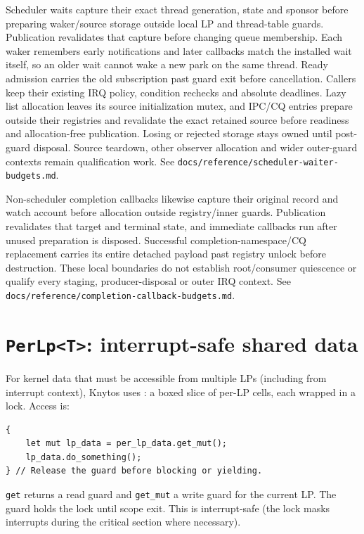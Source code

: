 Scheduler waits capture their exact thread generation, state and sponsor before
preparing waker/source storage outside local LP and thread-table guards.
Publication revalidates that capture before changing queue membership. Each
waker remembers early notifications and later callbacks match the installed
wait itself, so an older wait cannot wake a new park on the same thread. Ready
admission carries the old subscription past guard exit before cancellation.
Callers keep their existing IRQ policy, condition rechecks and absolute
deadlines. Lazy list allocation leaves its source initialization mutex, and IPC/CQ
entries prepare outside their registries and revalidate the exact retained
source before readiness and allocation-free publication. Losing or rejected
storage stays owned until post-guard disposal. Source teardown, other observer
allocation and wider outer-guard contexts remain qualification work.
See \texttt{docs/reference/scheduler-waiter-budgets.md}.

Non-scheduler completion callbacks likewise capture their original record and
watch account before allocation outside registry/inner guards. Publication
revalidates that target and terminal state, and immediate callbacks run after
unused preparation is disposed. Successful completion-namespace/CQ replacement
carries its entire detached payload past registry unlock before destruction.
These local boundaries do not establish root/consumer quiescence or qualify
every staging, producer-disposal or outer IRQ context. See
\texttt{docs/reference/completion-callback-budgets.md}.

\section{\texttt{PerLp<T>}: interrupt-safe shared data}

\label{sec:per-lp}

For kernel data that must be accessible from multiple LPs (including from
interrupt context), Knytos uses : a boxed slice of
per-LP cells, each wrapped in a lock. Access is:

\begin{lstlisting}[style=rustCode]
{
    let mut lp_data = per_lp_data.get_mut();
    lp_data.do_something();
} // Release the guard before blocking or yielding.
\end{lstlisting}

\texttt{get} returns a read guard and \texttt{get\_mut} a write guard for the
current LP. The guard holds the lock until scope exit. This is interrupt-safe
(the lock masks interrupts during the critical section where necessary).

